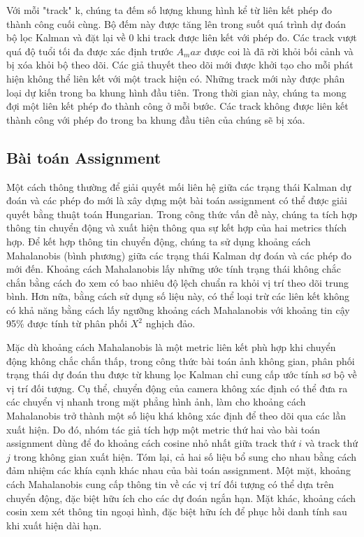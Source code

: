 Với mỗi "track" k, chúng ta đếm số lượng khung hình kể từ liên kết phép đo thành công cuối cùng. Bộ đếm này được tăng lên trong suốt quá trình dự đoán bộ lọc Kalman và đặt lại về 0 khi track được liên kết với phép đo. Các track vượt quá độ tuổi tối đa được xác định trước $A_max$ được coi là đã rời khỏi bối cảnh và bị xóa khỏi bộ theo dõi. Các giả thuyết theo dõi mới được khởi tạo cho mỗi phát hiện không thể liên kết với một track hiện có. Những track mới này được phân loại dự kiến trong ba khung hình đầu tiên. Trong thời gian này, chúng ta mong đợi một liên kết phép đo thành công ở mỗi bước. Các track không được liên kết thành công với phép đo trong ba khung đầu tiên của chúng sẽ bị xóa.

\subsection{Bài toán Assignment}
Một cách thông thường để giải quyết mối liên hệ giữa các trạng thái Kalman dự đoán và các phép đo mới là xây dựng một bài toán assignment có thể được giải quyết bằng thuật toán Hungarian. Trong công thức vấn đề này, chúng ta tích hợp thông tin chuyển động và xuất hiện thông qua sự kết hợp của hai metrics thích hợp.
Để kết hợp thông tin chuyển động, chúng ta sử dụng khoảng cách Mahalanobis (bình phương) giữa các trạng thái Kalman dự đoán và các phép đo mới đến. Khoảng cách Mahalanobis lấy những ước tính trạng thái không chắc chắn bằng cách đo xem có bao nhiêu độ lệch chuẩn ra khỏi vị trí theo dõi trung bình. Hơn nữa, bằng cách sử dụng số liệu này, có thể loại trừ các liên kết không có khả năng bằng cách lấy ngưỡng khoảng cách Mahalanobis với khoảng tin cậy 95\% được tính từ phân phối $X^2$ nghịch đảo.

Mặc dù khoảng cách Mahalanobis là một metric liên kết phù hợp khi chuyển động không chắc chắn thấp, trong công thức bài toán ảnh không gian, phân phối trạng thái dự đoán thu được từ khung lọc Kalman chỉ cung cấp ước tính sơ bộ về vị trí đối tượng. Cụ thể, chuyển động của camera không xác định có thể đưa ra các chuyển vị nhanh trong mặt phẳng hình ảnh, làm cho khoảng cách Mahalanobis trở thành một số liệu khá không xác định để theo dõi qua các lần xuất hiện. Do đó, nhóm tác giả tích hợp một metric thứ hai vào bài toán assignment dùng để đo khoảng cách cosine nhỏ nhất giữa track thứ $i$ và track thứ $j$ trong không gian xuất hiện.
Tóm lại, cả hai số liệu bổ sung cho nhau bằng cách đảm nhiệm các khía cạnh khác nhau của bài toán assignment. Một mặt, khoảng cách Mahalanobis cung cấp thông tin về các vị trí đối tượng có thể dựa trên chuyển động, đặc biệt hữu ích cho các dự đoán ngắn hạn. Mặt khác, khoảng cách cosin xem xét thông tin ngoại hình, đặc biệt hữu ích để phục hồi danh tính sau khi xuất hiện dài hạn.

